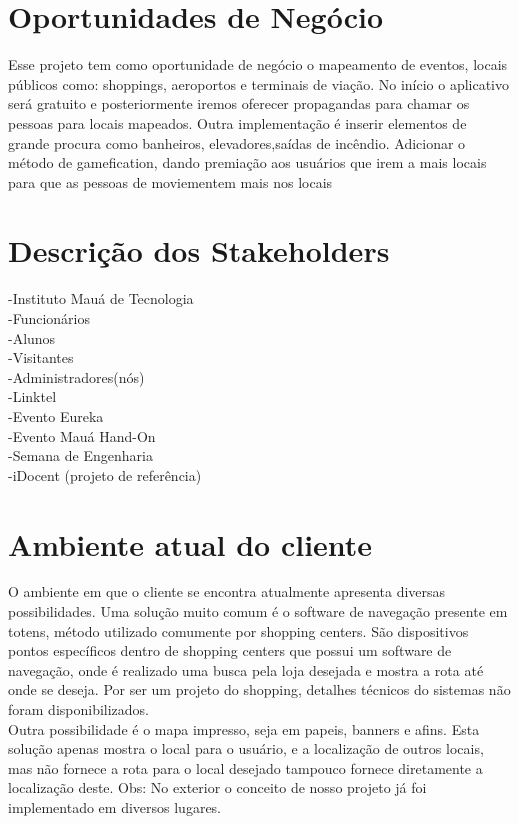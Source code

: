 \documentclass[13pt]{article}
\begin{document}
\section*{Oportunidades de Negócio}
	Esse projeto tem como oportunidade de negócio o mapeamento de eventos, locais públicos como: shoppings, aeroportos e terminais de viação.
	No início o aplicativo será gratuito e posteriormente iremos oferecer propagandas para chamar os pessoas para locais mapeados. Outra implementação é inserir elementos de grande procura como banheiros, elevadores,saídas de incêndio. Adicionar o método de gamefication, dando premiação aos usuários que irem a mais locais para que as pessoas de moviementem mais nos locais
\section*{Descrição dos Stakeholders}
	-Instituto Mauá de Tecnologia \\
	-Funcionários \\
	-Alunos \\
	-Visitantes \\
	-Administradores(nós)\\
	-Linktel \\
	-Evento Eureka \\
	-Evento Mauá Hand-On \\
	-Semana de Engenharia \\
	-iDocent (projeto de referência) \\ 
	
\section*{Ambiente atual do cliente}
O ambiente em que o cliente se encontra atualmente apresenta diversas possibilidades. Uma solução muito comum é o software de navegação presente em totens, método utilizado comumente por shopping centers. São dispositivos pontos específicos dentro de shopping centers que possui um software de navegação, onde é realizado uma busca pela loja desejada e mostra a rota até onde se deseja. Por ser um projeto do shopping, detalhes técnicos do sistemas não foram disponibilizados.\\
Outra possibilidade é o mapa impresso, seja em papeis, banners e afins. Esta solução apenas mostra o local para o usuário, e a localização de outros locais, mas não fornece a rota para o local desejado tampouco fornece diretamente a localização deste.
Obs: No exterior o conceito de nosso projeto já foi implementado em diversos lugares.
\end{document}
